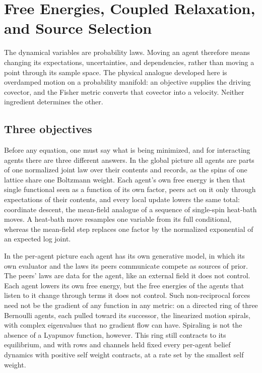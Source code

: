 \chapter{Free Energies, Coupled Relaxation, and Source Selection}
\label{comp:dynamics}

The dynamical variables are probability laws. Moving an agent therefore means changing its expectations, uncertainties, and dependencies, rather than moving a point through its sample space. The physical analogue developed here is overdamped motion on a probability manifold: an objective supplies the driving covector, and the Fisher metric converts that covector into a velocity. Neither ingredient determines the other.

\section{Three objectives}

Before any equation, one must say what is being minimized, and for interacting agents there are three different answers. In the global picture all agents are parts of one normalized joint law over their contents and records, as the spins of one lattice share one Boltzmann weight. Each agent's own free energy is then that single functional seen as a function of its own factor, peers act on it only through expectations of their contents, and every local update lowers the same total: coordinate descent, the mean-field analogue of a sequence of single-spin heat-bath moves. A heat-bath move resamples one variable from its full conditional, whereas the mean-field step replaces one factor by the normalized exponential of an expected log joint.

In the per-agent picture each agent has its own generative model, in which its own evaluator and the laws its peers communicate compete as sources of prior. The peers' laws are data for the agent, like an external field it does not control. Each agent lowers its own free energy, but the free energies of the agents that listen to it change through terms it does not control. Such non-reciprocal forces need not be the gradient of any function in any metric: on a directed ring of three Bernoulli agents, each pulled toward its successor, the linearized motion spirals, with complex eigenvalues that no gradient flow can have. Spiraling is not the absence of a Lyapunov function, however. This ring still contracts to its equilibrium, and with rows and channels held fixed every per-agent belief dynamics with positive self weight contracts, at a rate set by the smallest self weight.

